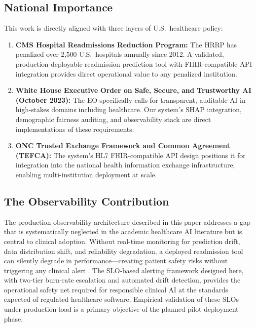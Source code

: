 \documentclass[11pt,letterpaper]{article}
\begin{document}
\subsection{National Importance}

This work is directly aligned with three layers of U.S.\ healthcare policy:

\begin{enumerate}[leftmargin=1.5em,itemsep=0.2em]
  \item \textbf{CMS Hospital Readmissions Reduction Program:} The HRRP has penalized over 2,500 U.S.\ hospitals annually since 2012. A validated, production-deployable readmission prediction tool with FHIR-compatible API integration provides direct operational value to any penalized institution.
  \item \textbf{White House Executive Order on Safe, Secure, and Trustworthy AI (October 2023):} The EO specifically calls for transparent, auditable AI in high-stakes domains including healthcare. Our system's SHAP integration, demographic fairness auditing, and observability stack are direct implementations of these requirements.
  \item \textbf{ONC Trusted Exchange Framework and Common Agreement (TEFCA):} The system's HL7 FHIR-compatible API design positions it for integration into the national health information exchange infrastructure, enabling multi-institution deployment at scale.
\end{enumerate}

\subsection{The Observability Contribution}

The production observability architecture described in this paper addresses a gap that is systematically neglected in the academic healthcare AI literature but is central to clinical adoption. Without real-time monitoring for prediction drift, data distribution shift, and reliability degradation, a deployed readmission tool can silently degrade in performance---creating patient safety risks without triggering any clinical alert \citep{sculley2015hidden}. The SLO-based alerting framework designed here, with two-tier burn-rate escalation and automated drift detection, provides the operational safety net required for responsible clinical AI at the standards expected of regulated healthcare software. Empirical validation of these SLOs under production load is a primary objective of the planned pilot deployment phase.
\end{document}
